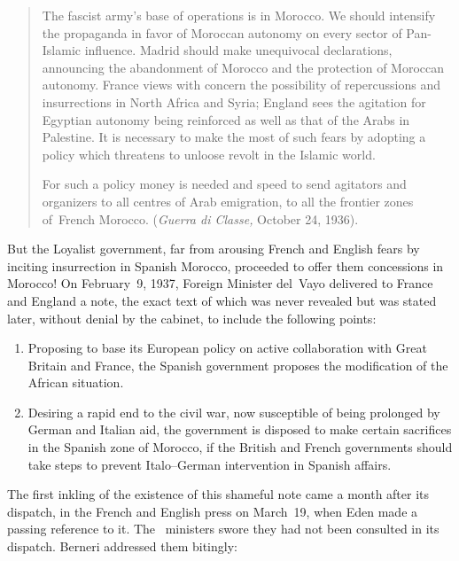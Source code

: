 \begin{quotation}
  The fascist army’s base of operations is in Morocco. We should intensify the propaganda in favor of Moroccan autonomy on every sector of Pan-Islamic influence. Madrid should make unequivocal declarations, announcing the abandonment of Morocco and the protection of Moroccan autonomy. France views with concern the possibility of repercussions and insurrections in North Africa and Syria; England sees the agitation for Egyptian autonomy being reinforced as well as that of the Arabs in Palestine. It is necessary to make the most of such fears by adopting a policy which threatens to unloose revolt in the Islamic world.
  
  For such a policy money is needed and speed to send agitators and organizers to all centres of Arab emigration, to all the frontier zones of~French Morocco. (\emph{Guerra di Classe,} October 24, 1936).
\end{quotation}

But the Loyalist government, far from arousing French and English fears by inciting insurrection in Spanish Morocco, proceeded to offer them concessions in Morocco! On February~9, 1937, Foreign Minister del~Vayo delivered to France and England a note, the exact text of which was never revealed but was stated later, without denial by the cabinet, to include the following points:

\begin{enumerate}
  \item Proposing to base its European policy on active collaboration with Great Britain and France, the Spanish government proposes the modification of the African situation.
  
  \item Desiring a rapid end to the civil war, now susceptible of being prolonged by German and Italian aid, the government is disposed to make certain sacrifices in the Spanish zone of Morocco, if the British and French governments should take steps to prevent Italo--German intervention in Spanish affairs.
\end{enumerate}

The first inkling of the existence of this shameful note came a month after its dispatch, in the French and English press on March~19, when Eden made a passing reference to it. The \CNT\ ministers swore they had not been consulted in its dispatch. Berneri addressed them bitingly:

